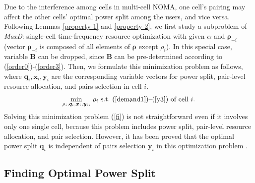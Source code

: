 \documentclass[10pt,journal,final,finalsubmission,twocolumn]{IEEEtran}
\begin{document}
Due to the interference among cells in multi-cell NOMA, one cell's pairing may affect the other cells' optimal power split among the users, and vice versa. Following Lemmas \ref{property 1} and \ref{property 2}, we first study a subproblem of {\em MaxD}: single-cell time-frequency resource optimization with given $\alpha$ and $\boldsymbol{\rho}_{-i}$ (vector $\boldsymbol{\rho}_{-i}$ is composed of all elements of $\boldsymbol{\rho}$ except $\rho_i$). In this special case, variable $\boldsymbol{B}$ can be dropped, since $\boldsymbol{B}$ can be pre-determined according to (\ref{order0})-(\ref{order3}). Then, we formulate this minimization problem as follows, where $\boldsymbol{q}_i,\boldsymbol{x}_i,\boldsymbol{y}_i$ are the corresponding variable vectors for power split, pair-level resource allocation, and pairs selection in cell $i$.
\begin{equation}\label{fi}
 \underset{\rho_i, \boldsymbol{q}_i,\boldsymbol{x}_i,\boldsymbol{y}_i,}{\min} \  \rho_i \ \textup{s.t.\ (\ref{demand1})--(\ref{y3}) of cell $i$} .
\end{equation}
Solving this minimization problem (\ref{fi}) is not straightforward even if it involves only one single cell, because this problem includes power split,  pair-level resource allocation, and pair selection. However, it has been proved that the optimal power split $\boldsymbol{q}_i$ is independent of pairs selection $\boldsymbol{y}_i$ in this optimization problem \cite[Theorem 1]{You1}.



\subsection{Finding Optimal Power Split}\label{OptimalPowerSplit}
\end{document}
